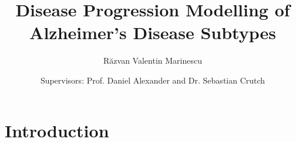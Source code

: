 \documentclass[8pt,xcolor=table]{beamer}
\title{Disease Progression Modelling of Alzheimer's Disease Subtypes}
\author[Raz \and Danny \and Seb]{
R\u{a}zvan Valentin Marinescu\vspace{1em} \newline \and Supervisors: Prof. Daniel Alexander and Dr. Sebastian Crutch
}
\institute{\small{Centre for Medical Image Computing, University College London, UK}

\vspace{0em}
}
\date{}
\begin{document}
 
\section{Introduction}

 

\newcommand{\epsrcPresLoc}{../upgrade_report/epsrcPres}


\newcommand{\titleHigh}[1]{{\transparent{1.0}\textbf{#1}}} %
\newcommand{\titleHighTwo}[1]{\underline{\textbf{#1}}} %
\newcommand{\transpLevel}{0.4}

% 
% 
% 




% 
% 
% 
\end{document}
